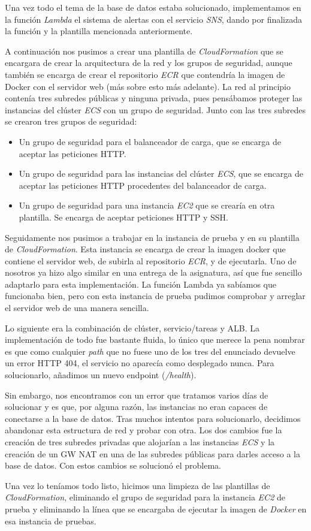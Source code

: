 Una vez todo el tema de la base de datos estaba solucionado, implementamos en la función \textit{Lambda} el sistema de alertas con el servicio \textit{SNS}, dando por finalizada la función y la plantilla mencionada anteriormente.

A continuación nos pusimos a crear una plantilla de \textit{CloudFormation} que se encargara de crear la arquitectura de la red y los grupos de seguridad, aunque también se encarga de crear el repositorio \textit{ECR} que contendría la imagen de Docker con el servidor web (más sobre esto más adelante). La red al principio contenía tres subredes públicas y ninguna privada, pues pensábamos proteger las instancias del clúster \textit{ECS} con un grupo de seguridad. Junto con las tres subredes se crearon tres grupos de seguridad:

\begin{itemize}
    \item Un grupo de seguridad para el balanceador de carga, que se encarga de aceptar las peticiones HTTP.
    \item Un grupo de seguridad para las instancias del clúster \textit{ECS}, que se encarga de aceptar las peticiones HTTP procedentes del balanceador de carga.
    \item Un grupo de seguridad para una instancia \textit{EC2} que se crearía en otra plantilla. Se encarga de aceptar peticiones HTTP y SSH.
\end{itemize}

Seguidamente nos pusimos a trabajar en la instancia de prueba y en su plantilla de \textit{CloudFormation}. Esta instancia se encarga de crear la imagen docker que contiene el servidor web, de subirla al repositorio \textit{ECR}, y de ejecutarla. Uno de nosotros ya hizo algo similar en una entrega de la asignatura, así que fue sencillo adaptarlo para esta implementación. La función Lambda ya sabíamos que funcionaba bien, pero con esta instancia de prueba pudimos comprobar y arreglar el servidor web de una manera sencilla.

Lo siguiente era la combinación de clúster, servicio/tareas y ALB. La implementación de todo fue bastante fluida, lo único que merece la pena nombrar es que como cualquier \textit{path} que no fuese uno de los tres del enunciado devuelve un error HTTP 404, el servicio no aparecía como desplegado nunca. Para solucionarlo, añadimos un nuevo endpoint (\textit{/health}).

Sin embargo, nos encontramos con un error que tratamos varios días de solucionar y es que, por alguna razón, las instancias no eran capaces de conectarse a la base de datos. Tras muchos intentos para solucionarlo, decidimos abandonar esta estructura de red y probar con otra. Los dos cambios fue la creación de tres subredes privadas que alojarían a las instancias \textit{ECS} y la creación de un GW NAT en una de las subredes públicas para darles acceso a la base de datos. Con estos cambios se solucionó el problema.

Una vez lo teníamos todo listo, hicimos una limpieza de las plantillas de \textit{CloudFormation}, eliminando el grupo de seguridad para la instancia \textit{EC2} de prueba y eliminando la línea que se encargaba de ejecutar la imagen de \textit{Docker} en esa instancia de pruebas.
